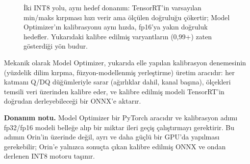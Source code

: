 \begin{figure}[H]
  \centering
  \caption{İki INT8 yolu, aynı hedef donanım: TensorRT'in varsayılan
    min/maks kırpması hızı verir ama ölçülen doğruluğu çökertir; Model
    Optimizer'ın kalibrasyonu aynı hızda, fp16'ya yakın doğruluk
    hedefler. Yukarıdaki kalibre edilmiş varyantların (0,99+) zaten
    gösterdiği yön budur.}
  \label{fig:modelopt-mantik}
\end{figure}

Mekanik olarak Model Optimizer, yukarıda elle yapılan kalibrasyon
denemesinin (yüzdelik dilim kırpma, füzyon-modellenmiş yerleştirme)
üretim aracıdır: her katmanı Q/DQ düğümleriyle sarar
(ağırlıklar dahil, kanal başına), ölçekleri temsili veri üzerinden
kalibre eder, ve kalibre edilmiş modeli TensorRT'in doğrudan derleyebileceği
bir ONNX'e aktarır.

\textbf{Donanım notu.} Model Optimizer bir PyTorch aracıdır ve kalibrasyon
adımı fp32/fp16 modeli belleğe alıp bir miktar ileri geçiş çalıştırmayı
gerektirir. Bu adımın Orin'in üzerinde değil, ayrı ve daha güçlü bir
GPU'da yapılması gerekebilir; Orin'e yalnızca sonuçta çıkan kalibre
edilmiş ONNX ve ondan derlenen INT8 motoru taşınır.

